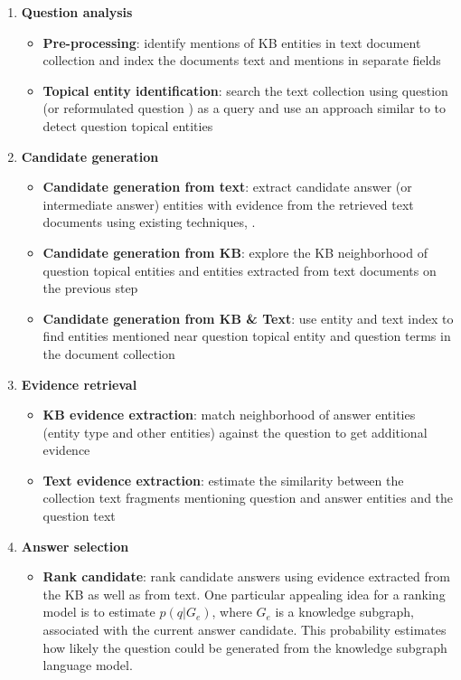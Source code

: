 \begin{enumerate}
\item \textbf{Question analysis}
	\begin{itemize}
	  \item \textbf{Pre-processing}: identify mentions of KB entities in text document collection and index the documents text and mentions in separate fields
  	  \item \textbf{Topical entity identification}: search the text collection using question (or reformulated question \cite{AgichteinLG01}) as a query and use an approach similar to \cite{cornolti2014smaph} to detect question topical entities
    \end{itemize}
  
\item \textbf{Candidate generation}
	\begin{itemize}
	  \item \textbf{Candidate generation from text}: extract candidate answer (or intermediate answer) entities with evidence from the retrieved text documents using existing techniques, \eg \cite{tsai2015web}.
  	  \item \textbf{Candidate generation from KB}: explore the KB neighborhood of question topical entities and entities extracted from text documents on the previous step
	  \item \textbf{Candidate generation from KB \& Text}: use entity and text index to find entities mentioned near question topical entity and question terms in the document collection
	\end{itemize}
\item \textbf{Evidence retrieval}
    \begin{itemize}
	  \item \textbf{KB evidence extraction}: match neighborhood of answer entities (entity type and other entities) against the question to get additional evidence
      \item \textbf{Text evidence extraction}: estimate the similarity between the collection text fragments mentioning question and answer entities and the question text
    \end{itemize}
\item \textbf{Answer selection}
	\begin{itemize}
	  \item \textbf{Rank candidate}: rank candidate answers using evidence extracted from the KB as well as from text. One particular appealing idea for a ranking model is to estimate $p(q|G_e)$, where $G_e$ is a knowledge subgraph, associated with the current answer candidate. This probability estimates how likely the question could be generated from the knowledge subgraph language model.
    \end{itemize}
\end{enumerate}

